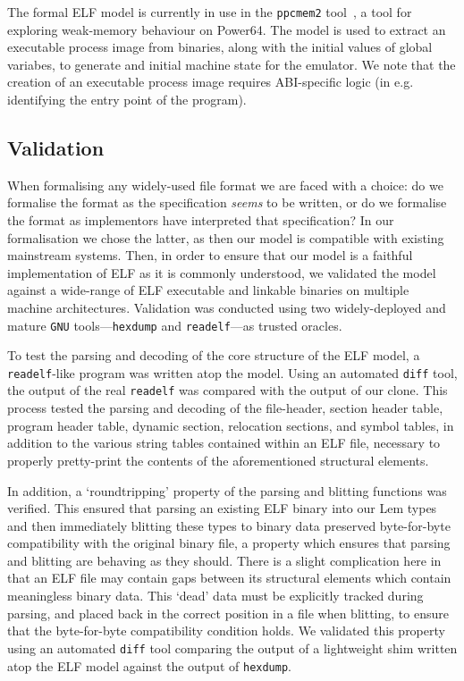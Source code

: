 The formal ELF model is currently in use in the \texttt{ppcmem2} tool~\cite{gray-integrated-2015}, a tool for exploring weak-memory behaviour on Power64.
The model is used to extract an executable process image from binaries, along with the initial values of global variabes, to generate and initial machine state for the emulator.
We note that the creation of an executable process image requires ABI-specific logic (in e.g. identifying the entry point of the program).

\subsection{Validation}
\label{subsect.elf.validation}

When formalising any widely-used file format we are faced with a choice: do we formalise the format as the specification \emph{seems} to be written, or do we formalise the format as implementors have interpreted that specification?
In our formalisation we chose the latter, as then our model is compatible with existing mainstream systems.
Then, in order to ensure that our model is a faithful implementation of ELF as it is commonly understood, we validated the model against a wide-range of ELF executable and linkable binaries on multiple machine architectures.
Validation was conducted using two widely-deployed and mature \texttt{GNU} tools---\texttt{hexdump} and \texttt{readelf}---as trusted oracles.

To test the parsing and decoding of the core structure of the ELF model, a \texttt{readelf}-like program was written atop the model.
Using an automated \texttt{diff} tool, the output of the real \texttt{readelf} was compared with the output of our clone.
This process tested the parsing and decoding of the file-header, section header table, program header table, dynamic section, relocation sections, and symbol tables, in addition to the various string tables contained within an ELF file, necessary to properly pretty-print the contents of the aforementioned structural elements.

In addition, a `roundtripping' property of the parsing and blitting functions was verified.
This ensured that parsing an existing ELF binary into our Lem types and then immediately blitting these types to binary data preserved byte-for-byte compatibility with the original binary file, a property which ensures that parsing and blitting are behaving as they should.
There is a slight complication here in that an ELF file may contain gaps between its structural elements which contain meaningless binary data.
This `dead' data must be explicitly tracked during parsing, and placed back in the correct position in a file when blitting, to ensure that the byte-for-byte compatibility condition holds.
We validated this property using an automated \texttt{diff} tool comparing the output of a lightweight shim written atop the ELF model against the output of \texttt{hexdump}.

